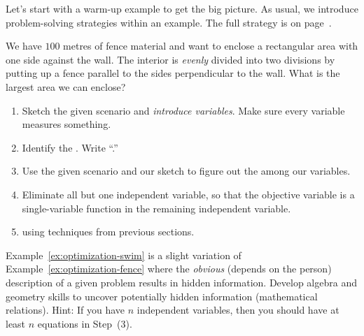 \documentclass[../main.tex]{subfiles}
\begin{document}
Let's start with a warm-up example to get the big picture. As usual, we introduce problem-solving strategies within an example. The full strategy is on page~\pageref{page:optimization-strategy}.
\begin{example} \label{ex:optimization-fence}
  We have \(100\) metres of fence material and want to enclose a rectangular area with one side against the wall. The interior is \emph{evenly} divided into two divisions by putting up a fence parallel to the sides perpendicular to the wall. What is the largest area we can enclose?

  \begin{enumerate}
    \item Sketch the given scenario and \emph{introduce variables}. Make sure every variable measures something.

    \item Identify the . Write ``\emph{}.''

    \item Use the given scenario and our sketch to figure out the  among our variables. 

    \item Eliminate all but one independent variable, so that the objective variable is a single-variable function in the remaining independent variable. 

    \item {} using techniques from previous sections.
  \end{enumerate}
\end{example}
\clearpage

Example~\ref{ex:optimization-swim} is a slight variation of Example~\ref{ex:optimization-fence} where the \emph{obvious} (depends on the person) description of a given problem results in hidden information. Develop algebra and geometry skills to uncover potentially hidden information (mathematical relations). Hint: If you have \(n\) independent variables, then you should have at least \(n\) equations in Step~(3).
\end{document}
